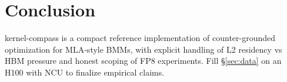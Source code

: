 \documentclass[11pt]{article}
\begin{document}
\section{Conclusion}
\textsf{kernel-compass} is a compact reference implementation of counter-grounded optimization for MLA-style BMMs, with explicit handling of L2 residency vs HBM pressure and honest scoping of FP8 experiments.
Fill \S\ref{sec:data} on an H100 with NCU to finalize empirical claims.



\end{document}
